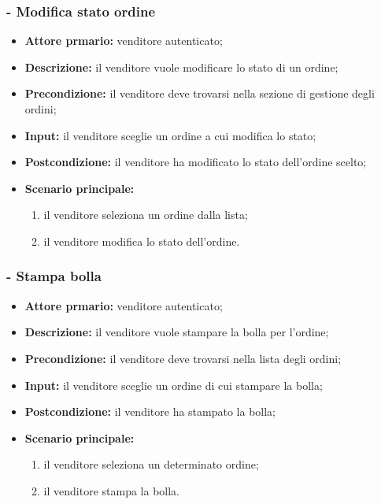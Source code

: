 \subsubsection{- Modifica stato ordine}
\begin{itemize}
    \item \textbf{Attore prmario:} venditore autenticato;
    \item \textbf{Descrizione:} il venditore vuole modificare lo stato di un ordine;
    \item \textbf{Precondizione:} il venditore deve trovarsi nella sezione di gestione degli ordini;
    \item \textbf{Input:} il venditore sceglie un ordine a cui modifica lo stato;
    \item \textbf{Postcondizione:} il venditore ha modificato lo stato dell'ordine scelto;
    \item \textbf{Scenario principale:}
          \begin{enumerate}
              \item il venditore seleziona un ordine dalla lista;
              \item il venditore modifica lo stato dell'ordine.
          \end{enumerate}
\end{itemize}

\stepsubUserCase
\subsubsection{- Stampa bolla}
\begin{itemize}
    \item \textbf{Attore prmario:} venditore autenticato;
    \item \textbf{Descrizione:} il venditore vuole stampare la bolla per l'ordine;
    \item \textbf{Precondizione:} il venditore deve trovarsi nella lista degli ordini;
    \item \textbf{Input:} il venditore sceglie un ordine di cui stampare la bolla;
    \item \textbf{Postcondizione:} il venditore ha stampato la bolla;
    \item \textbf{Scenario principale:}
          \begin{enumerate}
              \item il venditore seleziona un determinato ordine;
              \item il venditore stampa la bolla.
          \end{enumerate}
\end{itemize}

